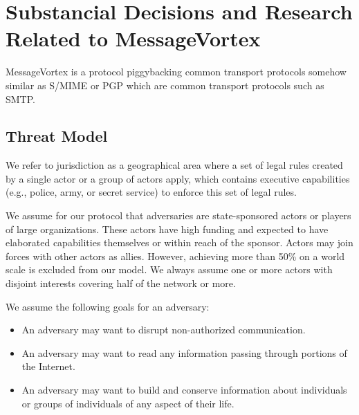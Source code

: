 \part{Substancial Decisions and Research Related to MessageVortex}

MessageVortex is a protocol piggybacking common transport protocols somehow similar as S/MIME\cite{RFC2015} or PGP\cite{PGP} which are common transport protocols such as SMTP. 



\chapter{Threat Model}
We refer to jurisdiction as a geographical area where a set of legal rules created by a single actor or a group of actors apply, which contains executive capabilities (e.g., police, army, or secret service) to enforce this set of legal rules.

We assume for our protocol that adversaries are state-sponsored actors or players of large organizations. These actors have high funding and expected to have elaborated capabilities themselves or within reach of the sponsor. Actors may join forces with other actors as allies. However, achieving more than 50\% on a world scale is excluded from our model. We always assume one or more actors with disjoint interests covering half of the network or more. 

We assume the following goals for an adversary:
\begin{itemize}
	\item An adversary may want to disrupt non-authorized communication.
	\item An adversary may want to read any information passing through portions of the Internet.
	\item An adversary may want to build and conserve information about individuals or groups of individuals of any aspect of their life. 
\end{itemize}

